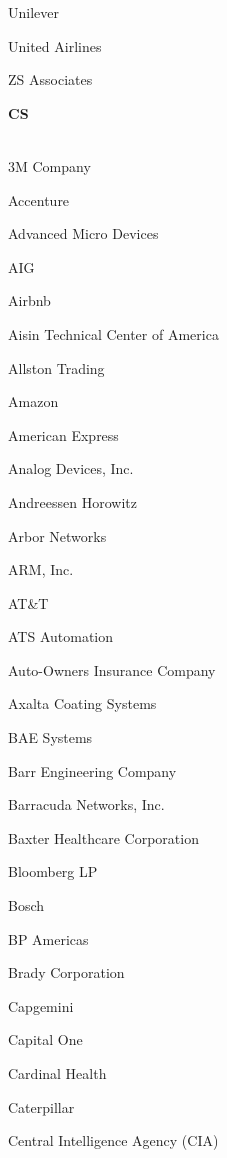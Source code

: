 \documentclass[twoside]{article}
\begin{document}
\begin{center}
\begin{multicols}{5}
\begin{FlushLeft}
\begin{compactitem}
\item Unilever
\item United Airlines
\item ZS Associates
\end{compactitem}
        \end{FlushLeft}
        \vspace{1em}
        {\fontsize{14}{16}\selectfont \bf CS}\\
        \vspace{-1em}
        ~\hrulefill~
        \vspace{-.9em}
        \begin{FlushLeft}
        \begin{compactitem}
        \item 3M Company
\item Accenture
\item Advanced Micro Devices
\item AIG
\item Airbnb
\item Aisin Technical Center of America
\item Allston Trading
\item Amazon
\item American Express
\item Analog Devices, Inc.
\item Andreessen Horowitz
\item Arbor Networks
\item ARM, Inc.
\item AT\&T
\item ATS Automation
\item Auto-Owners Insurance Company
\item Axalta Coating Systems
\item BAE Systems
\item Barr Engineering Company
\item Barracuda Networks, Inc.
\item Baxter Healthcare Corporation
\item Bloomberg LP
\item Bosch
\item BP Americas
\item Brady Corporation
\item Capgemini
\item Capital One
\item Cardinal Health
\item Caterpillar
\item Central Intelligence Agency (CIA)

\end{compactitem}
\end{FlushLeft}
\end{multicols}
\end{center}
\end{document}
